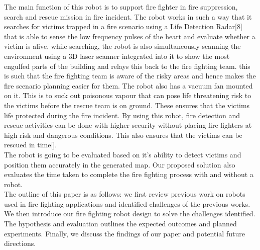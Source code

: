 The main function of this robot is to support fire fighter in fire suppression, search and rescue mission in fire incident. The robot works in such a way that it searches for victims trapped in a fire scenario using a Life Detection Radar[8] that is able to sense the low frequency pulses of the heart and evaluate whether a victim is alive. while searching, the robot is also simultaneously scanning the environment using a 3D laser scanner integrated into it to show the most engulfed parts of the building and relays this back to the fire fighting team. this is such that the fire fighting team is aware of the risky areas and hence makes the fire scenario planning easier for them. The robot also has a vacuum fan mounted on it. This is to suck out poisonous vapour that can pose life threatening risk to the victims before the rescue team is on ground. These ensures that the victims life protected during the fire incident. By using this robot, fire detection and rescue activities can be done with higher security without placing fire fighters at high risk and dangerous conditions. This also ensures that the victims can be rescued in time[].\\

The robot is going to be evaluated based on it's ability to detect victims and position them accurately in the generated map. Our proposed solution also evaluates the time taken to complete the fire fighting process with and without a robot.\\

The outline of this paper is as follows:
we first review previous work on robots used in fire fighting applications and identified challenges of the previous works. We then introduce our fire fighting robot design to solve the challenges identified. The hypothesis and evaluation outlines the expected outcomes and planned experiments. Finally, we discuss the findings of our paper and potential future directions.





